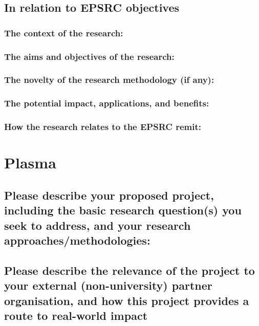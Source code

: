 \documentclass{article}
\begin{document}
\subsection{In relation to EPSRC objectives}

\subsubsection{The context of the research:}

\subsubsection{The aims and objectives of the research:}
 
\subsubsection{The novelty of the research methodology (if any):}
 
\subsubsection{The potential impact, applications, and benefits:}
 
\subsubsection{How the research relates to the EPSRC remit:}


\section{Plasma}

\subsection{Please describe your proposed project, including the basic research question(s) you seek to address, and your research approaches/methodologies:}








\subsection{Please describe the relevance of the project to your external (non-university) partner organisation, and how this project provides a route to real-world impact}
\end{document}
